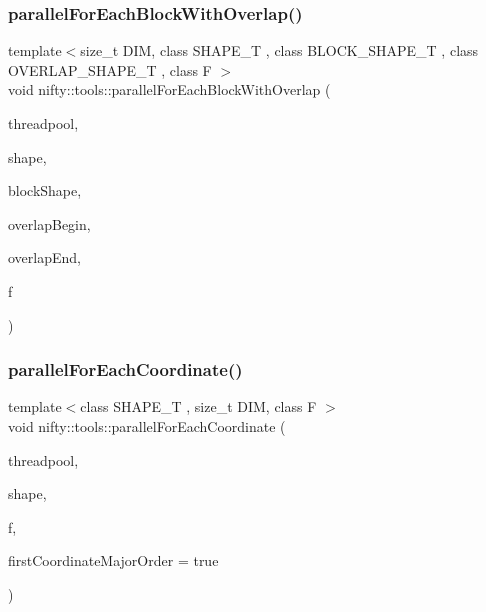 \subsubsection{\texorpdfstring{parallel\+For\+Each\+Block\+With\+Overlap()}{parallelForEachBlockWithOverlap()}}
{\footnotesize\ttfamily template$<$size\+\_\+t D\+IM, class S\+H\+A\+P\+E\+\_\+T , class B\+L\+O\+C\+K\+\_\+\+S\+H\+A\+P\+E\+\_\+T , class O\+V\+E\+R\+L\+A\+P\+\_\+\+S\+H\+A\+P\+E\+\_\+T , class F $>$ \\
void nifty\+::tools\+::parallel\+For\+Each\+Block\+With\+Overlap (\begin{DoxyParamCaption}\item[{\hyperlink{classnifty_1_1parallel_1_1ThreadPool}{parallel\+::\+Thread\+Pool} \&}]{threadpool,  }\item[{const \hyperlink{namespacenifty_1_1array_a683f151f19c851754e0c6d55ed16a0c2}{array\+::\+Static\+Array}$<$ S\+H\+A\+P\+E\+\_\+T, D\+IM $>$ \&}]{shape,  }\item[{const \hyperlink{namespacenifty_1_1array_a683f151f19c851754e0c6d55ed16a0c2}{array\+::\+Static\+Array}$<$ B\+L\+O\+C\+K\+\_\+\+S\+H\+A\+P\+E\+\_\+T, D\+IM $>$ \&}]{block\+Shape,  }\item[{const \hyperlink{namespacenifty_1_1array_a683f151f19c851754e0c6d55ed16a0c2}{array\+::\+Static\+Array}$<$ O\+V\+E\+R\+L\+A\+P\+\_\+\+S\+H\+A\+P\+E\+\_\+T, D\+IM $>$ \&}]{overlap\+Begin,  }\item[{const \hyperlink{namespacenifty_1_1array_a683f151f19c851754e0c6d55ed16a0c2}{array\+::\+Static\+Array}$<$ O\+V\+E\+R\+L\+A\+P\+\_\+\+S\+H\+A\+P\+E\+\_\+T, D\+IM $>$ \&}]{overlap\+End,  }\item[{F \&\&}]{f }\end{DoxyParamCaption})}

\mbox{\label{namespacenifty_1_1tools_a34595523082dffa3f21d4b40cc13cfae}} 
\subsubsection{\texorpdfstring{parallel\+For\+Each\+Coordinate()}{parallelForEachCoordinate()}}
{\footnotesize\ttfamily template$<$class S\+H\+A\+P\+E\+\_\+T , size\+\_\+t D\+IM, class F $>$ \\
void nifty\+::tools\+::parallel\+For\+Each\+Coordinate (\begin{DoxyParamCaption}\item[{\hyperlink{classnifty_1_1parallel_1_1ThreadPool}{nifty\+::parallel\+::\+Thread\+Pool} \&}]{threadpool,  }\item[{const \hyperlink{namespacenifty_1_1array_a683f151f19c851754e0c6d55ed16a0c2}{array\+::\+Static\+Array}$<$ S\+H\+A\+P\+E\+\_\+T, D\+IM $>$ \&}]{shape,  }\item[{F \&\&}]{f,  }\item[{bool}]{first\+Coordinate\+Major\+Order = {\ttfamily true} }\end{DoxyParamCaption})}


